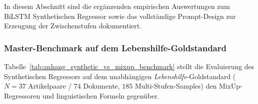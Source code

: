 In diesem Abschnitt sind die ergänzenden empirischen Auswertungen zum BiLSTM Synthetischen Regressor sowie das vollständige Prompt-Design zur Erzeugung der Zwischenstufen dokumentiert.

\subsubsection{Master-Benchmark auf dem Lebenshilfe-Goldstandard}

Tabelle~\ref{tab:anhang_synthetic_vs_mixup_benchmark} stellt die Evaluierung des Synthetischen Regressors auf dem unabhängigen \textit{Lebenshilfe}-Goldstandard ($N = 37$ Artikelpaare / $74$ Dokumente, $185$ Multi-Stufen-Samples) den MixUp-Regressoren und linguistischen Formeln gegenüber.

\begin{table}[htbp]
\centering
\small
\caption[Gesamtevaluation aller Regressoren und linguistischen Baselines]{Gesamtevaluation aller kontinuierlichen und diskreten Modellansätze auf dem Lebenshilfe-Goldstandard ($N = 37$ Artikelpaare / $74$ Dokumente) im Vergleich zwischen BiLSTM-MixUp-Regressoren, dem auf großen Sprachmodellen basierenden Synthetischen Regressor (Large Language Models, LLM) und Basisarchitekturen (Recurrent Neural Networks, RNN).}
\label{tab:anhang_synthetic_vs_mixup_benchmark}
\end{table}
